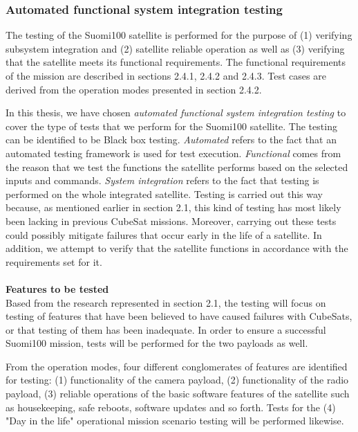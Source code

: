 \documentclass[english,12pt,a4paper,pdftex,elec,utf8]{aaltothesis}
\begin{document}
\subsubsection{Automated functional system integration testing}
The testing of the Suomi100 satellite is performed for the purpose of (1) verifying subsystem integration and (2) satellite reliable operation as well as (3) verifying that the satellite meets its functional requirements. The functional requirements of the mission are described in 
sections 2.4.1, 2.4.2 and 2.4.3. Test cases are derived from the operation modes presented in section 2.4.2.\par 
In this thesis, we have chosen \textit{automated functional system integration testing} to cover the type of tests that we perform for the Suomi100 satellite. The testing can be identified to be Black box testing. \textit{Automated} refers to the fact that an automated testing framework is used for test execution. \textit{Functional} comes from the reason that we test the functions the satellite performs based on the selected inputs and commands. \textit{System integration} refers to the fact that testing is performed on the whole integrated satellite. Testing is carried out this way because, as mentioned earlier in section 2.1, this kind of testing has most likely been lacking in previous CubeSat missions. Moreover,  carrying out these tests could possibly mitigate failures that occur early in the life of a satellite. In addition, we attempt to verify that the satellite functions in accordance with the requirements set for it.
\\
\\
\textbf{Features to be tested} 
\\
Based from the research represented in section 2.1, the testing will focus on testing of features that have been believed to have caused failures with CubeSats, or that testing of them has been inadequate. In order to ensure a successful Suomi100 mission, tests will be performed for the two payloads as well.\par
From the operation modes, four different conglomerates of features are identified for testing: (1) functionality of the camera payload, (2) functionality of the radio payload, (3) reliable operations of the basic software features of the satellite such as housekeeping, safe reboots, software updates and so forth. Tests for the (4) "Day in the life" operational mission scenario testing will be performed likewise.
\\
\end{document}
